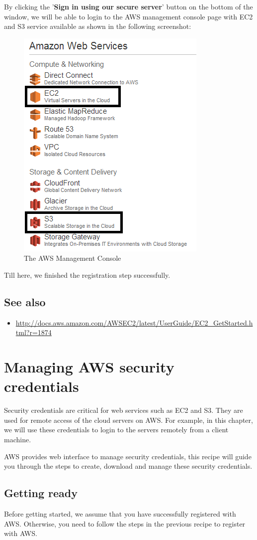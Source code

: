 By clicking the '\textbf{Sign in using our secure server}' button on the bottom of the window, we will be able to login to the AWS management console page with EC2 and S3 service available as shown in the following screenshot:
\begin{figure}[h]
  \centering
  \includegraphics[width=.5\textwidth]{figs/5163os_08_05.png}
  \caption{The AWS Management Console}\label{fig:aws.management.console}
\end{figure} 

Till here, we finished the registration step successfully.
\subsection*{See also}
\begin{itemize}
  \item \url{http://docs.aws.amazon.com/AWSEC2/latest/UserGuide/EC2_GetStarted.html?r=1874}
\end{itemize}

\section{Managing AWS security credentials}
Security credentials are critical for web services such as EC2 and S3. They are used for remote access of the cloud servers on AWS. For example, in this chapter, we will use these credentials to login to the servers remotely from a client machine.

AWS provides web interface to manage security credentials, this recipe will guide you through the steps to create, download and manage these security credentials.
\subsection*{Getting ready}
Before getting started, we assume that you have successfully registered with AWS. Otherwise, you need to follow the steps in the previous recipe to register with AWS.

